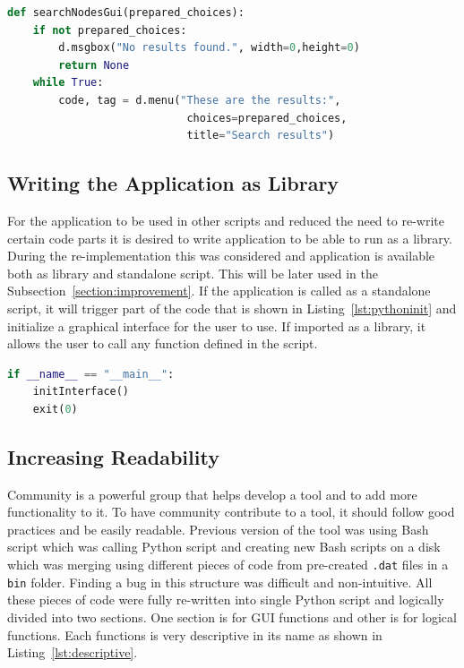 {\noindent\begin{minipage}{\linewidth}
\begin{lstlisting}[language=Python, numbers=none, label={lst:removingresultlimit}, caption=Removing Result Limitation, frame=single, showstringspaces=false]
def searchNodesGui(prepared_choices):
	if not prepared_choices:
		d.msgbox("No results found.", width=0,height=0)
		return None
	while True:
		code, tag = d.menu("These are the results:",
							choices=prepared_choices,
							title="Search results")
\end{lstlisting}
\end{minipage}
\subsection{Writing the Application as Library}
For the application to be used in other scripts and reduced the need to re-write certain code parts it is desired to write application to be able to run as a library. During the re-implementation this was considered and application is available both as library and standalone script. This will be later used in the Subsection~\ref{section:improvement}. If the application is called as a standalone script, it will trigger part of the code that is shown in Listing~\ref{lst:pythoninit} and initialize a graphical interface for the user to use. If imported as a library, it allows the user to call any function defined in the script.

{\noindent\begin{minipage}{\linewidth}
\begin{lstlisting}[language=Python, numbers=none, label={lst:descriptive}, caption=Example of Function Names, frame=single, showstringspaces=false, breaklines=true]
if __name__ == "__main__":
	initInterface()
	exit(0)
\end{lstlisting}
\end{minipage}

\subsection{Increasing Readability}
\label{subsection:readability}
Community is a powerful group that helps develop a tool and to add more functionality to it. To have community contribute to a tool, it should follow good practices and be easily readable. Previous version of the tool was using Bash script which was calling Python script and creating new Bash scripts on a disk which was merging using different pieces of code from pre-created \texttt{.dat} files in a \texttt{bin} folder. Finding a bug in this structure was difficult and non-intuitive. All these pieces of code were fully re-written into single Python script and logically divided into two sections. One section is for GUI functions and other is for logical functions. Each functions is very descriptive in its name as shown in Listing~\ref{lst:descriptive}.

}}

